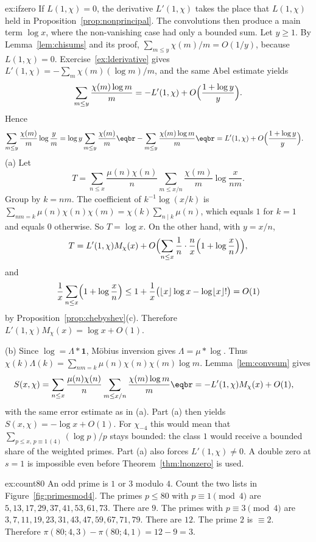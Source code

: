 \begin{solution}{ex:ifzero}
\idea If $L(1,\chi)=0$, the derivative $L'(1,\chi)$ takes the place that $L(1,\chi)$ held in Proposition~\ref{prop:nonprincipal}. The convolutions then produce a main term $\log x$, where the non-vanishing case had only a bounded sum.
\writeup Let $y\ge1$. By Lemma~\ref{lem:chisums} and its proof, $\sum_{m\le y}\chi(m)/m=O(1/y)$, because $L(1,\chi)=0$. Exercise~\ref{ex:lderivative} gives $L'(1,\chi)=-\sum_m\chi(m)(\log m)/m$, and the same Abel estimate yields
\[
\sum_{m\le y}\frac{\chi(m)\log m}m=-L'(1,\chi)+O\Bigl(\frac{1+\log y}y\Bigr).
\]
Hence
\[
\begin{aligned}\sum_{m\le y}\frac{\chi(m)}m\log\frac ym&=\log y\sum_{m\le y}\frac{\chi(m)}m\eqbr-\sum_{m\le y}\frac{\chi(m)\log m}m\eqbr=L'(1,\chi)+O\Bigl(\frac{1+\log y}y\Bigr).\end{aligned}
\]
(a) Let
\[
T=\sum_{n\le x}\frac{\mu(n)\chi(n)}n\sum_{m\le x/n}\frac{\chi(m)}m\log\frac x{nm}.
\]
Group by $k=nm$. The coefficient of $k^{-1}\log(x/k)$ is $\sum_{nm=k}\mu(n)\chi(n)\chi(m)=\chi(k)\sum_{n\mid k}\mu(n)$, which equals $1$ for $k=1$ and equals $0$ otherwise. So $T=\log x$. On the other hand, with $y=x/n$,
\[
T=L'(1,\chi)M_\chi(x)+O\Bigl(\sum_{n\le x}\frac1n\cdot\frac nx\Bigl(1+\log\frac xn\Bigr)\Bigr),
\]
and
\[
\frac1x\sum_{n\le x}\Bigl(1+\log\frac xn\Bigr)\le1+\frac1x\bigl(\lfloor x\rfloor\log x-\log\lfloor x\rfloor!\bigr)=O(1)
\]
by Proposition~\ref{prop:chebyshev}(c). Therefore $L'(1,\chi)M_\chi(x)=\log x+O(1)$.

(b) Since $\log=\Lambda*\mathbf1$, Möbius inversion gives $\Lambda=\mu*\log$. Thus $\chi(k)\Lambda(k)=\sum_{nm=k}\mu(n)\chi(n)\chi(m)\log m$. Lemma~\ref{lem:convsum} gives
\[
\begin{aligned}S(x,\chi)&=\sum_{n\le x}\frac{\mu(n)\chi(n)}n\sum_{m\le x/n}\frac{\chi(m)\log m}m\eqbr=-L'(1,\chi)M_\chi(x)+O(1),\end{aligned}
\]
with the same error estimate as in (a). Part (a) then yields $S(x,\chi)=-\log x+O(1)$. For $\chi_{-4}$ this would mean that $\sum_{p\le x,\,p\equiv1\,(4)}(\log p)/p$ stays bounded: the class $1$ would receive a bounded share of the weighted primes. Part (a) also forces $L'(1,\chi)\ne0$. A double zero at $s=1$ is impossible even before Theorem~\ref{thm:lnonzero} is used.
\end{solution}

\begin{solution}{ex:count80}
\idea An odd prime is $1$ or $3$ modulo $4$. Count the two lists in Figure~\ref{fig:primesmod4}.
\writeup The primes $p\le80$ with $p\equiv1\pmod4$ are $5,13,17,29,37,41,53,61,73$. There are $9$. The primes with $p\equiv3\pmod4$ are $3,7,11,19,23,31,43,47,59,67,71,79$. There are $12$. The prime $2$ is $\equiv2$. Therefore $\pi(80;4,3)-\pi(80;4,1)=12-9=3$.
\end{solution}


